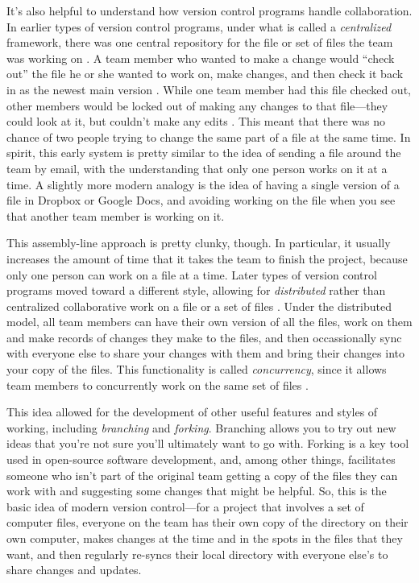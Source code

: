 \documentclass[]{tufte-book}
\begin{document}
It's also helpful to understand how version control programs handle
collaboration. In earlier types of version control programs, under what is
called a \emph{centralized} framework, there was one central repository for the file
or set of files the team was working on \citep{raymondunderstanding, target2018version, irving2011astonishments}. A team member who wanted to make
a change would ``check out'' the file he or she wanted to work on, make changes,
and then check it back in as the newest main version \citep{raymond2003art}. While
one team member had this file checked out, other members would be locked out of
making any changes to that file---they could look at it, but couldn't make any
edits \citep{raymondunderstanding, target2018version}. This meant that there was no
chance of two people trying to change the same part of a file at the same time.
In spirit, this early system is pretty similar to the idea of sending a file
around the team by email, with the understanding that only one person works on
it at a time. A slightly more modern analogy is the idea of having a single
version of a file in Dropbox or Google Docs, and avoiding working on the file
when you see that another team member is working on it.

This assembly-line approach is pretty clunky, though. In particular, it usually
increases the amount of time that it takes the team to finish the project,
because only one person can work on a file at a time. Later types of version
control programs moved toward a different style, allowing for \emph{distributed}
rather than centralized collaborative work on a file or a set of files
\citep{raymondunderstanding, irving2011astonishments}. Under the distributed model,
all team members can have their own version of all the files, work on them and
make records of changes they make to the files, and then occassionally sync with
everyone else to share your changes with them and bring their changes into your
copy of the files. This functionality is called \emph{concurrency}, since it allows
team members to concurrently work on the same set of files
\citep{raymondunderstanding}.

This idea allowed for the development of other useful features and styles of
working, including \emph{branching} and \emph{forking}. Branching allows you to try out
new ideas that you're not sure you'll ultimately want to go with. Forking is a
key tool used in open-source software development, and, among other things,
facilitates someone who isn't part of the original team getting a copy of the
files they can work with and suggesting some changes that might be helpful. So,
this is the basic idea of modern version control---for a project that involves a
set of computer files, everyone on the team has their own copy of the directory
on their own computer, makes changes at the time and in the spots in the files
that they want, and then regularly re-syncs their local directory with everyone
else's to share changes and updates.
\end{document}
